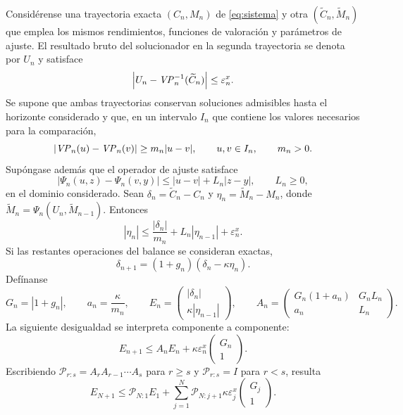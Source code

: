 \begin{theorem}
\label{thm:propagacion}
Considérense una trayectoria exacta $(C_n,M_n)$ de \cref{eq:sistema}
y otra $(\widetilde C_n,\widetilde M_n)$ que emplea los mismos
rendimientos, funciones de valoración y parámetros de ajuste. El resultado
bruto del solucionador en la segunda trayectoria se denota por $U_n$ y
satisface
\[
  \left|U_n-\mathit{VP}_n^{-1}(\widetilde C_n)\right|
  \le \varepsilon_n^x .
\]
Se supone que ambas trayectorias conservan soluciones admisibles hasta el
horizonte considerado y que, en un intervalo $I_n$ que contiene los valores
necesarios para la comparación,
\[
  |\mathit{VP}_n(u)-\mathit{VP}_n(v)|\ge m_n|u-v|,
  \qquad u,v\in I_n,\qquad m_n>0.
\]
Supóngase además que el operador de ajuste satisface
\[
  |\Psi_n(u,z)-\Psi_n(v,y)|
  \le |u-v|+L_n|z-y|,\qquad L_n\ge0,
\]
en el dominio considerado. Sean
$\delta_n=\widetilde C_n-C_n$ y
$\eta_n=\widetilde M_n-M_n$, donde
$\widetilde M_n=\Psi_n(U_n,\widetilde M_{n-1})$.
Entonces
\begin{equation}
\label{eq:prop-mesada}
  |\eta_n|\le \frac{|\delta_n|}{m_n}
       +L_n|\eta_{n-1}|+\varepsilon_n^x .
\end{equation}
Si las restantes operaciones del balance se consideran exactas,
\begin{equation}
\label{eq:prop-saldo}
  \delta_{n+1}=(1+g_n)(\delta_n-\kappa\eta_n).
\end{equation}
Defínanse
\[
  G_n=|1+g_n|,\qquad a_n=\frac{\kappa}{m_n},\qquad
  E_n=\begin{pmatrix}|\delta_n|\\ \kappa|\eta_{n-1}|\end{pmatrix},
  \qquad
  A_n=\begin{pmatrix}
       G_n(1+a_n)&G_nL_n\\
       a_n&L_n
      \end{pmatrix}.
\]
La siguiente desigualdad se interpreta componente a componente:
\begin{equation}
\label{eq:prop-cota}
  E_{n+1}\le A_nE_n+
       \kappa\varepsilon_n^x
       \begin{pmatrix}G_n\\1\end{pmatrix}.
\end{equation}
Escribiendo $\mathcal P_{r:s}=A_rA_{r-1}\cdots A_s$ para $r\ge s$ y
$\mathcal P_{r:s}=I$ para $r<s$, resulta
\[
 E_{N+1}\le \mathcal P_{N:1}E_1+
 \sum_{j=1}^{N}\mathcal P_{N:j+1}
       \kappa\varepsilon_j^x
       \begin{pmatrix}G_j\\1\end{pmatrix}.
\]
\end{theorem}
